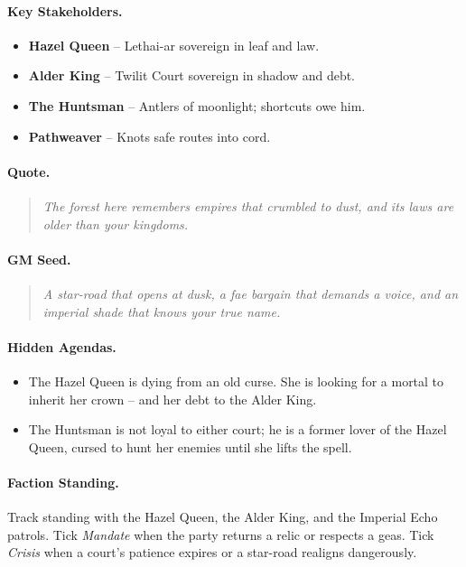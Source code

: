 \paragraph{Key Stakeholders.}
\begin{itemize}
  \item \textbf{Hazel Queen} -- Lethai-ar sovereign in leaf and law.
  \item \textbf{Alder King} -- Twilit Court sovereign in shadow and debt.
  \item \textbf{The Huntsman} -- Antlers of moonlight; shortcuts owe him.
  \item \textbf{Pathweaver} -- Knots safe routes into cord.
\end{itemize}

\paragraph{Quote.}
\begin{quote}
\emph{\textquotedbl The forest here remembers empires that crumbled to dust, and its laws are older than your kingdoms.\textquotedbl}
\end{quote}

\paragraph{GM Seed.}
\begin{quote}
\emph{A star-road that opens at dusk, a fae bargain that demands a voice, and an imperial shade that knows your true name.}
\end{quote}

\paragraph{Hidden Agendas.}
\begin{itemize}
  \item The Hazel Queen is dying from an old curse. She is looking for a mortal to inherit her crown -- and her debt to the Alder King.
  \item The Huntsman is not loyal to either court; he is a former lover of the Hazel Queen, cursed to hunt her enemies until she lifts the spell.
\end{itemize}

\paragraph{Faction Standing.}
Track standing with the Hazel Queen, the Alder King, and the Imperial Echo patrols. Tick \textit{Mandate} when the party returns a relic or respects a geas. Tick \textit{Crisis} when a court's patience expires or a star-road realigns dangerously.

